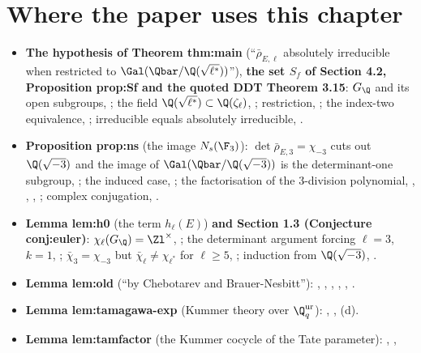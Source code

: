 \section*{Where the paper uses this chapter}

\begin{itemize}
\item \textbf{The hypothesis of Theorem thm:main} (``$\bar\rho_{E,\ell}$ absolutely irreducible when restricted to $\Gal(\Qbar/\Q(\sqrt{\ell^*}))$''),
\textbf{the set $S_f$ of Section 4.2, Proposition prop:Sf and the quoted DDT Theorem 3.15}: $G_\Q$ and its open subgroups, ;
the field $\Q(\sqrt{\ell^*})\subset\Q(\zeta_\ell)$, ; restriction, ; the index-two equivalence,
; irreducible equals absolutely irreducible, .
\item \textbf{Proposition prop:ns} (the image $N_s(\F_3)$): $\det\bar\rho_{E,3}=\chi_{-3}$ cuts out $\Q(\sqrt{-3})$ and the image of
$\Gal(\Qbar/\Q(\sqrt{-3}))$ is the determinant-one subgroup, ; the induced case, ; the
factorisation of the $3$-division polynomial, , , ,
; complex conjugation, .
\item \textbf{Lemma lem:h0} (the term $h_\ell(E)$) \textbf{and Section 1.3 (Conjecture conj:euler)}: $\chi_\ell(G_\Q)=\Zl^\times$,
; the determinant argument forcing $\ell=3$, $k=1$, ; $\bar\chi_3=\chi_{-3}$ but
$\bar\chi_\ell\ne\chi_{\ell^*}$ for $\ell\ge5$, ; induction from $\Q(\sqrt{-3})$, .
\item \textbf{Lemma lem:old} (``by Chebotarev and Brauer-Nesbitt''): , ,
, , , .
\item \textbf{Lemma lem:tamagawa-exp} (Kummer theory over $\Q_q^{\mathrm{ur}}$): , ,
(d).
\item \textbf{Lemma lem:tamfactor} (the Kummer cocycle of the Tate parameter): , ,

\end{itemize}
